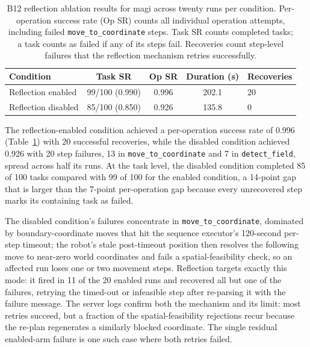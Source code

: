 \begin{table}[t]
	\centering
	\begin{tabular}{lcccl}
		\hline
		\textbf{Condition}  & \textbf{Task SR}      &
		\textbf{Op SR}      & \textbf{Duration (s)} & \textbf{Recoveries}              \\
		\hline
		Reflection enabled  & 99/100 (0.990)        & 0.996               & 202.1 & 20 \\
		Reflection disabled & 85/100 (0.850)        & 0.926               & 135.8 & 0  \\
		\hline
	\end{tabular}
	\caption{B12 reflection ablation results for \gls{magi} across twenty runs per condition. Per-operation success rate (Op SR) counts all individual operation attempts, including failed \texttt{move\_to\_coordinate} steps. Task SR counts completed tasks; a task counts as failed if any of its steps fail. Recoveries count step-level failures that the reflection mechanism retries successfully.}
	\label{tab:b12-results}
\end{table}

The reflection-enabled condition achieved a per-operation success rate of 0.996 (Table~\ref{tab:b12-results}) with 20 successful recoveries, while the disabled condition achieved 0.926 with 20 step failures, 13 in \texttt{move\_to\_coordinate} and 7 in \texttt{detect\_field}, spread across half its runs. At the task level, the disabled condition completed 85 of 100 tasks compared with 99 of 100 for the enabled condition, a 14-point gap that is larger than the 7-point per-operation gap because every unrecovered step marks its containing task as failed.

The disabled condition's failures concentrate in \texttt{move\_to\_coordinate}, dominated by boundary-coordinate moves that hit the sequence executor's 120-second per-step timeout; the robot's stale post-timeout position then resolves the following move to near-zero world coordinates and fails a spatial-feasibility check, so an affected run loses one or two movement steps. Reflection targets exactly this mode: it fired in 11 of the 20 enabled runs and recovered all but one of the failures, retrying the timed-out or infeasible step after re-parsing it with the failure message. The server logs confirm both the mechanism and its limit: most retries succeed, but a fraction of the spatial-feasibility rejections recur because the re-plan regenerates a similarly blocked coordinate. The single residual enabled-arm failure is one such case where both retries failed.

